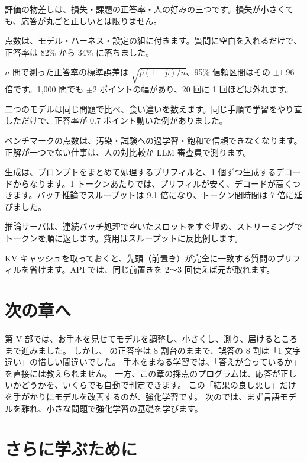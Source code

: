 \begin{summary}
\item 評価の物差しは、損失・課題の正答率・人の好みの三つです。損失が小さくても、応答が丸ごと正しいとは限りません。
\item 点数は、モデル・ハーネス・設定の組に付きます。質問に空白を入れるだけで、正答率は 82\% から 34\% に落ちました。
\item $n$ 問で測った正答率の標準誤差は $\sqrt{\hat p(1-\hat p)/n}$、95\% 信頼区間はその $\pm1.96$ 倍です。1,000 問でも $\pm2$ ポイントの幅があり、20 回に 1 回ほどは外れます。
\item 二つのモデルは同じ問題で比べ、食い違いを数えます。同じ手順で学習をやり直しただけで、正答率が 0.7 ポイント動いた例がありました。
\item ベンチマークの点数は、汚染・試験への過学習・飽和で信頼できなくなります。正解が一つでない仕事は、人の対比較か LLM 審査員で測ります。
\item 生成は、プロンプトをまとめて処理するプリフィルと、1 個ずつ生成するデコードからなります。1 トークンあたりでは、プリフィルが安く、デコードが高くつきます。バッチ推論でスループットは 9.1 倍になり、トークン間時間は 7 倍に延びました。
\item 推論サーバは、連続バッチ処理で空いたスロットをすぐ埋め、ストリーミングでトークンを順に返します。費用はスループットに反比例します。
\item KV キャッシュを取っておくと、先頭（前置き）が完全に一致する質問のプリフィルを省けます。API では、同じ前置きを 2〜3 回使えば元が取れます。
\end{summary}

\section*{次の章へ}

第 V 部では、お手本を見せてモデルを調整し、小さくし、測り、届けるところまで進みました。
しかし、 の正答率は 8 割台のままで、誤答の 8 割は「1 文字違い」の惜しい間違いでした。
手本をまねる学習では、「答えが合っているか」を直接には教えられません。
一方、この章の採点のプログラムは、応答が正しいかどうかを、いくらでも自動で判定できます。
この「結果の良し悪し」だけを手がかりにモデルを改善するのが、強化学習です。
次のでは、まず言語モデルを離れ、小さな問題で強化学習の基礎を学びます。

\section*{さらに学ぶために}

